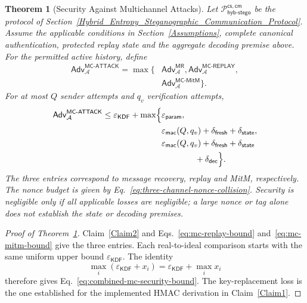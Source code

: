 \documentclass[pdflatex,sn-mathphys-num]{sn-jnl}%
\newtheorem{theorem}{Theorem}
\theoremstyle{definition}
\theoremstyle{game}
\theoremstyle{thmstyleone}%
\theoremstyle{thmstyletwo}%
\theoremstyle{thmstylethree}%
\begin{document}
\begin{theorem}[Security Against Multichannel Attacks]\label{theoremMTM}
Let $\mathcal P^{\mathsf{cs,cm}}_{\mathsf{hyb\text{-}stego}}$ be the protocol
of Section~\ref{Hybrid_Entropy_Steganographic_Communication_Protocol}.
Assume the applicable conditions in Section~\ref{Assumptions}, complete
canonical authentication, protected replay state and the aggregate decoding
premise above. For the permitted active history, define
\begin{equation}\label{Theorem:3}
\begin{aligned}
\mathsf{Adv}^{\mathsf{MC\text{-}ATTACK}}_{\mathcal A}
=\max\bigl\{&\mathsf{Adv}^{\mathsf{MR}}_{\mathcal A},
\mathsf{Adv}^{\mathsf{MC\text{-}REPLAY}}_{\mathcal A},\\
&\mathsf{Adv}^{\mathsf{MC\text{-}MitM}}_{\mathcal A}\bigr\}.
\end{aligned}
\end{equation}
For at most $Q$ sender attempts and $q_v$ verification attempts,
\begin{equation}\label{eq:combined-mc-security-bound}
\begin{aligned}
\mathsf{Adv}^{\mathsf{MC\text{-}ATTACK}}_{\mathcal A}
\le\varepsilon_{\mathsf{KDF}}+\max\Bigl\{&
\varepsilon_{\mathsf{param}},\\
&\varepsilon_{\mathsf{mac}}(Q,q_v)+\delta_{\mathsf{fresh}}
+\delta_{\mathsf{state}},\\
&\varepsilon_{\mathsf{mac}}(Q,q_v)+\delta_{\mathsf{fresh}}
+\delta_{\mathsf{state}}\\
&\hspace{14mm}+\delta_{\mathsf{dec}}\Bigr\}.
\end{aligned}
\end{equation}
The three entries correspond to message recovery, replay and MitM,
respectively. The nonce budget is given by
Eq.~\eqref{eq:three-channel-nonce-collision}. Security is negligible only
if all applicable losses are negligible; a large nonce or tag alone does
not establish the state or decoding premises.
\end{theorem}

\begin{proof}[Proof of Theorem~\ref{theoremMTM}]
Claim~\ref{Claim2} and Eqs.~\eqref{eq:mc-replay-bound}
and~\eqref{eq:mc-mitm-bound} give the three entries. Each real-to-ideal
comparison starts with the same uniform upper bound
$\varepsilon_{\mathsf{KDF}}$. The identity
\[
\max_i(\varepsilon_{\mathsf{KDF}}+x_i)
=\varepsilon_{\mathsf{KDF}}+\max_i x_i
\]
therefore gives Eq.~\eqref{eq:combined-mc-security-bound}.
The key-replacement loss is the one established for the implemented HMAC
derivation in Claim~\ref{Claim1}.
\end{proof}
\end{document}
